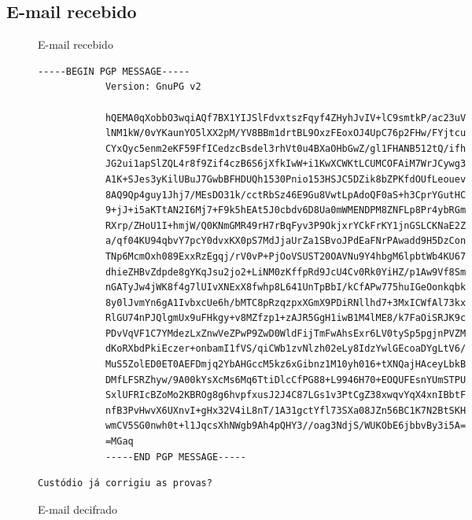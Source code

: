 \documentclass[
    article,            %
    11pt,               %
    oneside,            %
    a4paper,            %
    english,            %
    brazil,             %
    sumario=tradicional,
    ]{abntex2}
\begin{document}
\subsection{\textbf{E-mail recebido}}

\begin{figure}[H]
    \centering
    \caption{E-mail recebido}
    \label{fig5}
    \begin{Verbatim}[frame=single, commandchars=\\\{\}, fontsize=\footnotesize]
            -----BEGIN PGP MESSAGE-----
            Version: GnuPG v2

            hQEMA0qXobbO3wqiAQf7BX1YIJSlFdvxtszFqyf4ZHyhJvIV+lC9smtkP/ac23uV
            lNM1kW/0vYKaunYO5lXX2pM/YV8BBm1drtBL9OxzFEoxOJ4UpC76p2FHw/FYjtcu
            CYxQyc5enm2eKF59FfICedzcBsdel3rhVt0u4BXaOHbGwZ/gl1FHANB512tQ/ifh
            JG2ui1apSlZQL4r8f9Zif4czB6S6jXfkIwW+i1KwXCWKtLCUMCOFAiM7WrJCywg3
            A1K+SJes3yKilUBuJ7GwbBFHDUQh1530Pnio153HSJC5DZik8bZPKfdOUfLeouev
            8AQ9Qp4guy1Jhj7/MEsDO31k/cctRbSz46E9Gu8VwtLpAdoQF0aS+h3CprYGutHC
            9+jJ+i5aKTtAN2I6Mj7+F9k5hEAt5J0cbdv6D8Ua0mWMENDPM8ZNFLp8Pr4ybRGm
            RXrp/ZHoU1I+hmjW/Q0KNmGMR49rH7rBqFyv3P9OkjxrYCkFrKY1jnGSLCKNaE2Z
            a/qf04KU94qbvY7pcY0dvxKX0pS7MdJjaUrZa1SBvoJPdEaFNrPAwadd9H5DzCon
            TNp6McmOxh089ExxRzEgqj/rV0vP+PjOoVSUST20OAVNu9Y4hbgM6lpbtWb4KU67
            dhieZHBvZdpde8gYKqJsu2jo2+LiNM0zKffpRd9JcU4Cv0Rk0YiHZ/p1Aw9Vf8Sm
            nGATyJw4jWK8f4g7lUIvXNExX8fwhp8L641UnTpBbI/kCfAPw775huIGeOonkqbk
            8y0lJvmYn6gA1IvbxcUe6h/bMTC8pRzqzpxXGmX9PDiRNllhd7+3MxICWfAl73kx
            RlGU74nPJQlgmUx9uFHkgy+v8MZfzp1+zAJR5GgH1iwB1M4lME8/k7FaOiSRJK9c
            PDvVqVF1C7YMdezLxZnwVeZPwP9ZwD0WldFijTmFwAhsExr6LV0tySp5pgjnPVZM
            dKoRXbdPkiEczer+onbamI1fVS/qiCWb1zvNlzh02eLy8IdzYwlGEcoaDYgLtV6/
            MuS5ZolED0ET0AEFDmjq2YbAHGccM5kz6xGibnz1M10yh016+tXNQajHAceyLbkB
            DMfLFSRZhyw/9A00kYsXcMs6Mq6TtiDlcCfPG88+L9946H70+EOQUFEsnYUmSTPU
            SxlUFRIcBZoMo2KBROg8g6hvpfxusJ2J4C87LGs1v3PtCgZ38xwqvYqX4xnIBbtF
            nfB3PvHwvX6UXnvI+gHx32V4iL8nT/1A31gctYfl73SXa08JZn56BC1K7N2BtSKH
            wmCV5SG0nwh0t+l1JqcsXhNWgb9Ah4pQHY3//oag3NdjS/WUKObE6jbbvBy3i5A=
            =MGaq
            -----END PGP MESSAGE-----
    \end{Verbatim}
    \caption{E-mail decifrado}
    \label{fig6}
    \begin{Verbatim}[frame=single, commandchars=\\\{\}, fontsize=\footnotesize]
                            Custódio já corrigiu as provas?
    \end{Verbatim}
\end{figure}
\end{document}
